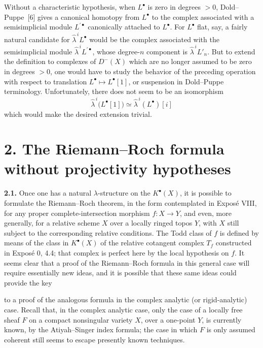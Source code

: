 Without a characteristic hypothesis, when $L^\bullet$ is zero in degrees $>0$, Dold--Puppe~[6] gives a canonical homotopy from $L^\bullet$ to the complex associated with a semisimplicial module $L^{\prime\bullet}$ canonically attached to $L^\bullet$. For $L^\bullet$ flat, say, a fairly natural candidate for $\widehat{\lambda}^{\,i}L^\bullet$ would be the complex associated with the semisimplicial module $\widehat{\lambda}^{\,i}L^{\prime\bullet}$, whose degree-$n$ component is $\widehat{\lambda}^{\,i}L'_n$. But to extend the definition to complexes of $D^-(X)$ which are no longer assumed to be zero in degrees $>0$, one would have to study the behavior of the preceding operation with respect to translation $L^\bullet\mapsto L^\bullet[1]$, or suspension in Dold--Puppe terminology. Unfortunately, there does not seem to be an isomorphism
\[
  \widehat{\lambda}^{\,i}\bigl(L^\bullet[1]\bigr)
  \simeq\widehat{\lambda}^{\,i}(L^\bullet)[i]
\]
which would make the desired extension trivial.

\section*{2. The Riemann--Roch formula without projectivity hypotheses}

\textbf{2.1.} Once one has a natural $\lambda$-structure on the $K^\bullet(X)$, it is possible to formulate the Riemann--Roch theorem, in the form contemplated in Expos\'e VIII, for any proper complete-intersection morphism $f:X\to Y$, and even, more generally, for a relative scheme $X$ over a locally ringed topos $Y$, with $X$ still subject to the corresponding relative conditions. The Todd class of $f$ is defined by means of the class in $K^\bullet(X)$ of the relative cotangent complex $T_f$ constructed in Expos\'e 0, 4.4; that complex is perfect here by the local hypothesis on $f$. It seems clear that a proof of the Riemann--Roch formula in this general case will require essentially new ideas, and it is possible that these same ideas could provide the key

to a proof of the analogous formula in the complex analytic (or rigid-analytic) case. Recall that, in the complex analytic case, only the case of a locally free sheaf $F$ on a compact nonsingular variety $X$, over a one-point $Y$, is currently known, by the Atiyah--Singer index formula; the case in which $F$ is only assumed coherent still seems to escape presently known techniques.

